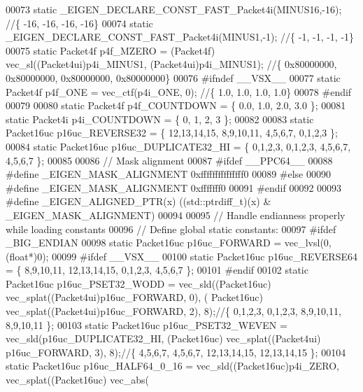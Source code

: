 \begin{DoxyCode}
00073 \textcolor{keyword}{static} \_EIGEN\_DECLARE\_CONST\_FAST\_Packet4i(MINUS16,-16); \textcolor{comment}{//\{ -16, -16, -16, -16\}}
00074 \textcolor{keyword}{static} \_EIGEN\_DECLARE\_CONST\_FAST\_Packet4i(MINUS1,-1); \textcolor{comment}{//\{ -1, -1, -1, -1\}}
00075 \textcolor{keyword}{static} Packet4f p4f\_MZERO = (Packet4f) vec\_sl((Packet4ui)p4i\_MINUS1, (Packet4ui)p4i\_MINUS1); \textcolor{comment}{//\{
       0x80000000, 0x80000000, 0x80000000, 0x80000000\}}
00076 \textcolor{preprocessor}{#ifndef \_\_VSX\_\_}
00077 \textcolor{keyword}{static} Packet4f p4f\_ONE = vec\_ctf(p4i\_ONE, 0); \textcolor{comment}{//\{ 1.0, 1.0, 1.0, 1.0\}}
00078 \textcolor{preprocessor}{#endif}
00079 
00080 \textcolor{keyword}{static} Packet4f p4f\_COUNTDOWN = \{ 0.0, 1.0, 2.0, 3.0 \};
00081 \textcolor{keyword}{static} Packet4i p4i\_COUNTDOWN = \{ 0, 1, 2, 3 \};
00082 
00083 \textcolor{keyword}{static} Packet16uc p16uc\_REVERSE32 = \{ 12,13,14,15, 8,9,10,11, 4,5,6,7, 0,1,2,3 \};
00084 \textcolor{keyword}{static} Packet16uc p16uc\_DUPLICATE32\_HI = \{ 0,1,2,3, 0,1,2,3, 4,5,6,7, 4,5,6,7 \};
00085 
00086 \textcolor{comment}{// Mask alignment}
00087 \textcolor{preprocessor}{#ifdef \_\_PPC64\_\_}
00088 \textcolor{preprocessor}{#define \_EIGEN\_MASK\_ALIGNMENT   0xfffffffffffffff0}
00089 \textcolor{preprocessor}{#else}
00090 \textcolor{preprocessor}{#define \_EIGEN\_MASK\_ALIGNMENT   0xfffffff0}
00091 \textcolor{preprocessor}{#endif}
00092 
00093 \textcolor{preprocessor}{#define \_EIGEN\_ALIGNED\_PTR(x)   ((std::ptrdiff\_t)(x) & \_EIGEN\_MASK\_ALIGNMENT)}
00094 
00095 \textcolor{comment}{// Handle endianness properly while loading constants}
00096 \textcolor{comment}{// Define global static constants:}
00097 \textcolor{preprocessor}{#ifdef \_BIG\_ENDIAN}
00098 \textcolor{keyword}{static} Packet16uc p16uc\_FORWARD = vec\_lvsl(0, (\textcolor{keywordtype}{float}*)0);
00099 \textcolor{preprocessor}{#ifdef \_\_VSX\_\_}
00100 \textcolor{keyword}{static} Packet16uc p16uc\_REVERSE64 = \{ 8,9,10,11, 12,13,14,15, 0,1,2,3, 4,5,6,7 \};
00101 \textcolor{preprocessor}{#endif}
00102 \textcolor{keyword}{static} Packet16uc p16uc\_PSET32\_WODD   = vec\_sld((Packet16uc) vec\_splat((Packet4ui)p16uc\_FORWARD, 0), (
      Packet16uc) vec\_splat((Packet4ui)p16uc\_FORWARD, 2), 8);\textcolor{comment}{//\{ 0,1,2,3, 0,1,2,3, 8,9,10,11, 8,9,10,11 \};}
00103 \textcolor{keyword}{static} Packet16uc p16uc\_PSET32\_WEVEN  = vec\_sld(p16uc\_DUPLICATE32\_HI, (Packet16uc) vec\_splat((Packet4ui)
      p16uc\_FORWARD, 3), 8);\textcolor{comment}{//\{ 4,5,6,7, 4,5,6,7, 12,13,14,15, 12,13,14,15 \};}
00104 \textcolor{keyword}{static} Packet16uc p16uc\_HALF64\_0\_16 = vec\_sld((Packet16uc)p4i\_ZERO, vec\_splat((Packet16uc) vec\_abs(

\end{DoxyCode}
